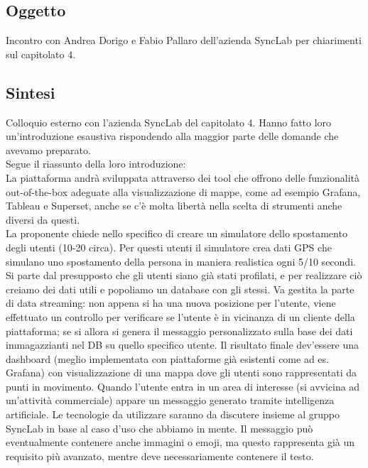 \documentclass[12pt]{article}
\begin{document}
\subsection{Oggetto}
Incontro con Andrea Dorigo e Fabio Pallaro dell'azienda SyncLab per chiarimenti sul capitolato 4.\\ 
\subsection{Sintesi}
Colloquio esterno con l'azienda SyncLab del capitolato 4.
Hanno fatto loro un'introduzione esaustiva rispondendo alla maggior parte delle domande che avevamo preparato.\\
\vspace{2mm}
Segue il riassunto della loro introduzione:\\
\vspace{2mm}
La piattaforma andrà sviluppata attraverso dei tool che offrono delle funzionalità out-of-the-box adeguate alla visualizzazione di mappe, come ad esempio Grafana, Tableau e Superset, anche se c'è molta libertà nella scelta di strumenti anche diversi da questi. \\ 
La proponente chiede nello specifico di creare un simulatore dello spostamento degli utenti (10-20 circa). Per questi utenti il simulatore crea dati GPS che simulano uno spostamento della persona in maniera realistica ogni 5/10 secondi.\newline
Si parte dal presupposto che gli utenti siano già stati profilati, e per realizzare ciò creiamo dei dati utili e popoliamo un database con gli stessi.\newline 
Va gestita la parte di data streaming: non appena si ha una nuova posizione per l'utente, viene effettuato un controllo per verificare se l'utente è in vicinanza di un cliente della piattaforma; se si allora si genera il messaggio personalizzato sulla base dei dati immagazzianti nel DB su quello specifico utente.\newline
Il risultato finale dev'essere una dashboard (meglio implementata con piattaforme già esistenti come ad es. Grafana) con visualizzazione di una mappa dove gli utenti sono rappresentati da punti in movimento. Quando l'utente entra in un area di interesse (si avvicina ad un'attività commerciale) appare un messaggio generato tramite intelligenza artificiale. Le tecnologie da utilizzare saranno da discutere insieme al gruppo SyncLab in base al caso d'uso che abbiamo in mente.
Il messaggio può eventualmente contenere anche immagini o emoji, ma questo rappresenta già un requisito più avanzato, mentre deve necessariamente contenere il testo.\newline 
\end{document}
